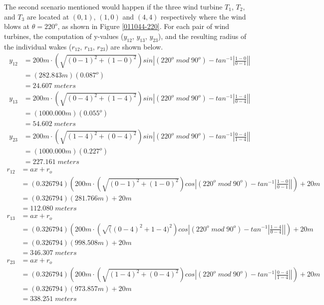     The second scenario mentioned would happen if the three wind turbine $T_1$, $T_2$, and $T_3$ are located at $(0,1)$, $(1,0)$ and $(4,4)$ respectively where the wind blows at $\theta=220^o$, as shown in Figure \ref{011044-220}. For each pair of wind turbines, the computation of  y-values ($y_{12}$, $y_{13}$, $y_{23}$), and the resulting radius of the individual wakes ($r_{12}$, $r_{13}$, $r_{23}$) are shown below.
    \begin{align*}
        y_{12}
        &=200m\cdot \left( \sqrt{(0-1)^2+(1-0)^2} \right) sin \left| (220^o\;mod\;90^o) - tan^{-1}\left|\frac{1-0}{0-1}\right| \right| \\
        &=\left( 282.843m \right)(0.087^o) \\
        &= 24.607\;meters
    \end{align*}
    \begin{align*}
        y_{13}
        &=200m\cdot \left( \sqrt{(0-4)^2+(1-4)^2} \right) sin \left| (220^o\;mod\;90^o) - tan^{-1}\left|\frac{1-4}{0-4}\right| \right| \\
        &=\left( 1000.000m \right)(0.055^o) \\
        &= 54.602\;meters
    \end{align*}
    \begin{align*}
        y_{23}
        &=200m\cdot \left( \sqrt{(1-4)^2+(0-4)^2} \right) sin \left| (220^o\;mod\;90^o) - tan^{-1}\left|\frac{0-4}{1-4}\right| \right| \\
        &=\left( 1000.000m \right)(0.227^o) \\
        &= 227.161\;meters
    \end{align*}
    \begin{align*}
        r_{12}
        &= ax+r_o \\
        &= (0.326794)\left( 200m\cdot \left( \sqrt{(0-1)^2+(1-0)^2} \right)cos \left| (220^o\;mod\;90^o) - tan^{-1}\left|\frac{1-0}{0-1}\right| \right|  \right) + 20m \\
        &=(0.326794)(281.766m)+20m \\
        &= 112.080\;meters
    \end{align*}
    \begin{align*}
        r_{13}
        &= ax+r_o \\
        &= (0.326794)\left( 200m\cdot \left( \sqrt((0-4)^2+{1-4)^2} \right)cos \left| (220^o\;mod\;90^o) - tan^{-1}\left|\frac{1-4}{0-4}\right| \right| \right) + 20m \\
        &=(0.326794)(998.508m)+20m \\
        &= 346.307\;meters
    \end{align*}
    \begin{align*}
        r_{23}
        &= ax+r_o \\
        &= (0.326794)\left( 200m\cdot \left( \sqrt{(1-4)^2+(0-4)^2} \right)cos \left| (220^o\;mod\;90^o) - tan^{-1}\left|\frac{0-4}{1-4}\right| \right| \right) + 20m \\
        &=(0.326794)(973.857m)+20m \\
        &= 338.251\;meters
    \end{align*}
    
